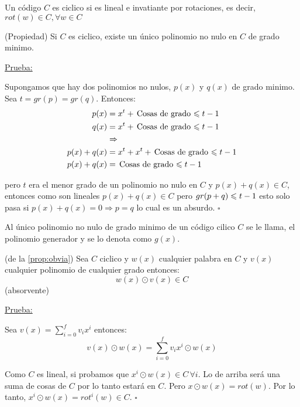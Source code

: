 \documentclass[12pt,a4paper]{article}
\begin{document}
\begin{definition} Un código $C$ es ciclico si es lineal e invatiante por rotaciones, 
    es decir, $rot(w) \in C, \forall w\in C$
\end{definition}

\begin{definition} (Propiedad) Si $C$ es ciclico, existe un único polinomio no nulo 
    en $C$ de grado minimo.
\end{definition}

\underline{Prueba:}
\medskip

Supongamos que hay dos polinomios no nulos, $p(x)$ y $q(x)$ de grado minimo. Sea 
$t = gr(p) = gr(q)$. Entonces:
\begin{align*}
    p(x) &= x^{t} + \,\text{Cosas de grado $\leqslant t-1$}\\
    q(x) &= x^{t} + \,\text{Cosas de grado $\leqslant t-1$}\\
    &\Rightarrow \\
    p(x) + q(x) &= x^{t} + x^{t} + \,\text{Cosas de grado $\leqslant t-1$}\\
    p(x) + q(x) &=  \,\text{Cosas de grado $\leqslant t-1$}
\end{align*}

pero $t$ era el menor grado de un polinomio no nulo en $C$ y $p(x) + q(x) \in C$, 
entonces como son lineales $p(x) + q(x) \in C$ pero $gr(p+q) \leqslant t-1$ esto solo pasa 
si $p(x) + q(x) = 0 \Rightarrow p=q$ lo cual es un absurdo. $\square$

\begin{definition} Al único polinomio no nulo de grado minimo de un código cilico 
    $C$ se le llama, el polinomio generador y se lo denota como $g(x)$.
\end{definition}

\begin{corolario} (de la \ref{prop:obvia}) Sea $C$ ciclico y $w(x)$ cualquier palabra 
    en $C$ y $v(x)$ cualquier polinomio de cualquier grado entonces:
    $$w(x) \odot v(x) \in C$$
    (absorvente)
\end{corolario}

\underline{Prueba:}
\medskip

Sea $v(x) = \sum_{i=0}^{f} v_{i}x^{i}$ entonces:
$$v(x)\odot w(x) = \sum_{i=0}^{f} v_{i}x^{i} \odot w(x) $$

Como $C$ es lineal, si probamos que $x^{i} \odot w(x) \in C\, \forall i$. Lo de 
arriba será una suma de cosas de $C$ por lo tanto estará en $C$. Pero $x \odot w(x) = rot(w)$. 
Por lo tanto, $x^{i} \odot w(x) = rot^{i}(w) \in C$. $\square$
\end{document}
